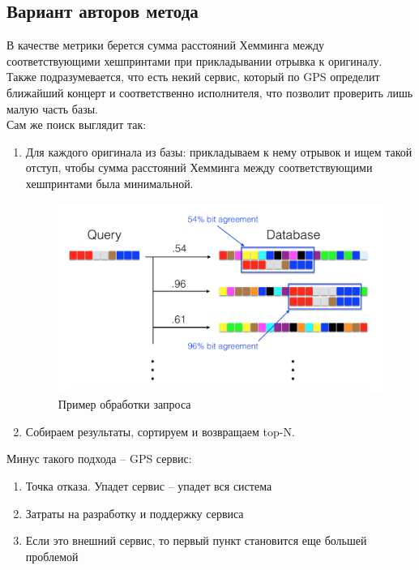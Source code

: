 \subsection{Вариант авторов метода}
В качестве метрики берется сумма расстояний Хемминга между соответствующими хешпринтами
при прикладывании отрывка к оригиналу.
Также подразумевается, что есть некий сервис, который по GPS определит
ближайший концерт и соответственно исполнителя, что позволит проверить лишь малую часть базы.\\
Сам же поиск выглядит так:
\begin{enumerate}[label=\arabic*.]
    \item Для каждого оригинала из базы: прикладываем к нему отрывок и ищем такой отступ, чтобы сумма расстояний
    Хемминга между соответствующими хешпринтами была минимальной.
    \begin{figure}[H]
        \begin{center}
            \includegraphics[scale=0.5]{inc/img/query.png}
            \caption{Пример обработки запроса}
        \end{center}
    \end{figure}
    \item Собираем результаты, сортируем и возвращаем top-N.
\end{enumerate}

Минус такого подхода -- GPS сервис:
\begin{enumerate}[label=\arabic*.]
    \item Точка отказа. Упадет сервис -- упадет вся система
    \item Затраты на разработку и поддержку сервиса
    \item Если это внешний сервис, то первый пункт становится еще большей проблемой
\end{enumerate}

